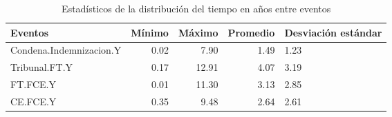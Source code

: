 \begin{table}[htbp]
\centering
\caption{Estadísticos de la distribución del
tiempo en años entre eventos} 
\label{tab:eventos-otros}
\begin{tabular}{p{6cm}rrrR{2cm}}
  \hline
Eventos & Mínimo & Máximo & Promedio & Desviación estándar \\ 
  \hline
Condena.Indemnizacion.Y & 0.02 & 7.90 & 1.49 & 1.23 \\ 
  Tribunal.FT.Y & 0.17 & 12.91 & 4.07 & 3.19 \\ 
  FT.FCE.Y & 0.01 & 11.30 & 3.13 & 2.85 \\ 
  CE.FCE.Y & 0.35 & 9.48 & 2.64 & 2.61 \\ 
   \hline
\end{tabular}
\end{table}
